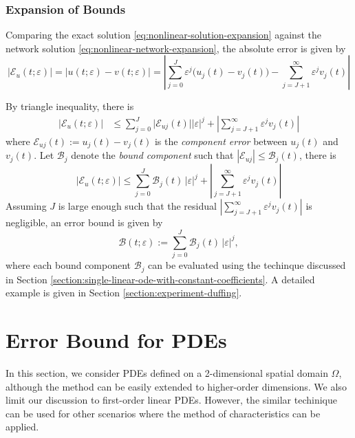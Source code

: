 \documentclass{article}
\newcommand{\Err}{\mathcal{E}}
\newcommand{\Bound}{\mathcal{B}}
\begin{document}
\subsubsection{Expansion of Bounds}
Comparing the exact solution \ref{eq:nonlinear-solution-expansion} against the network solution \ref{eq:nonlinear-network-expansion}, the absolute error is given by 
\begin{equation}
   |\Err_u(t; \varepsilon)| = \Big|u(t; \varepsilon) - v(t; \varepsilon)\Big| = \left|\sum_{j=0}^{J} \varepsilon^{j} \Big(u_j(t) - v_j(t)\Big) - \sum_{j=J+1}^{\infty} \varepsilon^j v_j(t)\right|
\end{equation}

By triangle inequality, there is 
\begin{align}
   \Big|\Err_u(t; \varepsilon)\Big| &\leq \sum_{j=0}^{J} \Big|\Err_{uj}(t)\Big||\varepsilon|^j + \left|\sum_{j=J+1}^{\infty}\varepsilon^j v_j(t)\right|
\end{align}
where $\Err_{uj}(t) := u_j(t) - v_j(t)$ is the \textit{component error} between $u_j(t)$ and $v_j(t)$.
Let $\Bound_{j}$ denote the \textit{bound component} such that $|\Err_{uj}| \leq \Bound_j(t)$, there is 
\begin{equation}
   \Big|\Err_u(t; \varepsilon)\Big| \leq \sum_{j=0}^{J} \Bound_j(t)\,|\varepsilon|^j + \left|\sum_{j=J+1}^{\infty}\varepsilon^j v_j(t)\right|
\end{equation}
Assuming $J$ is large enough such that the residual $\displaystyle \left|\sum_{j=J+1}^{\infty}\varepsilon^j v_j(t)\right|$ is negligible, an error bound is given by
\begin{equation}
    \Bound(t; \varepsilon) := \sum_{j=0}^{J} \Bound_j(t)\,|\varepsilon|^j,
\end{equation} 
where each bound component $\Bound_j$ can be evaluated using the techinque discussed in Section \ref{section:single-linear-ode-with-constant-coefficients}. A detailed example is given in Section \ref{section:experiment-duffing}.

\section{Error Bound for PDEs}
In this section, we consider PDEs defined on a 2-dimensional spatial domain $\Omega$, although the method can be easily extended to higher-order dimensions. We also limit our discussion to first-order linear PDEs. However, the similar techinique can be used for other scenarios where the method of characteristics can be applied.
\end{document}
